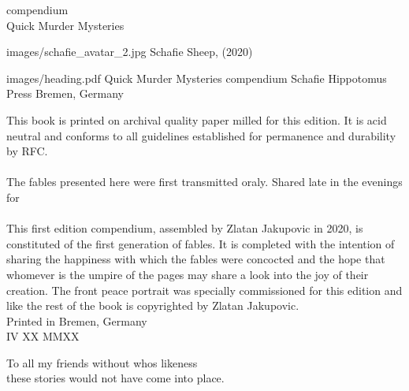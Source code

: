 \documentclass{medievalBook}
\begin{document}
\begin{halfTitle}
  {\authorFont compendium} \\
  \vspace{10pt}
  \LARGE{\floweroneleft Quick Murder Mysteries \floweroneright}
\end{halfTitle}

\begin{frontispiece}
      {images/schafie_avatar_2.jpg}
      {Schafie Sheep, (2020)}
\end{frontispiece}

\begin{titlePage}
      {images/heading.pdf}
      {Quick Murder Mysteries}
      {compendium}
      {Schafie}
      {Hippotomus Press}
      {Bremen, Germany}
\end{titlePage}

\begin{colophon}
   {This book is printed on archival quality paper milled for this edition. It is acid neutral and conforms to all guidelines established for permanence and durability by RFC. \\\\
   The fables presented here were first transmitted oraly. Shared late in the evenings for  \\\\
   This first edition compendium, assembled by Zlatan Jakupovic in 2020, is constituted of the first generation of fables. It is completed with the intention of sharing the happiness with which the fables were concocted and the hope that whomever is the umpire of the pages may share a look into the joy of their creation.
   The front peace portrait was specially commissioned for this edition and like the rest of the book is copyrighted  by Zlatan Jakupovic. \\}
   {Printed in Bremen, Germany \\}
   {IV  XX  MMXX}
\end{colophon}

\begin{dedication}
   To all my friends without whos likeness \\
   these stories would not have come into place.
\end{dedication}



\tableofcontents

\begin{story}
 
\end{story}
\end{document}
